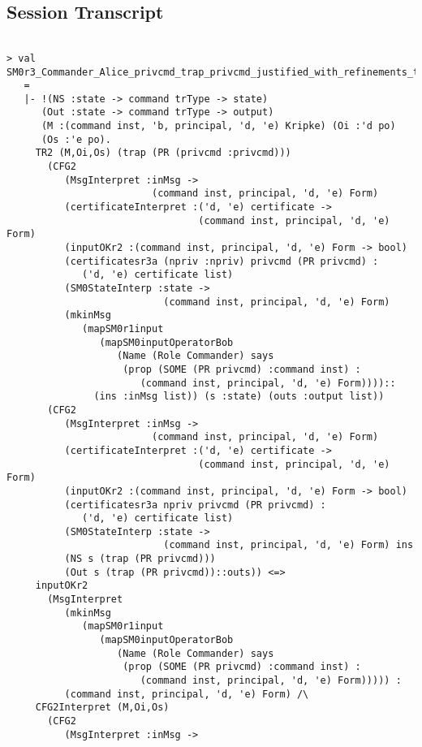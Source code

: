 \documentclass{report}
\begin{document}
\subsection{Session Transcript}
\label{trans6}
\begin{session}
  \begin{scriptsize}
\begin{verbatim}

> val SM0r3_Commander_Alice_privcmd_trap_privcmd_justified_with_refinements_thm
   =
   |- !(NS :state -> command trType -> state)
      (Out :state -> command trType -> output)
      (M :(command inst, 'b, principal, 'd, 'e) Kripke) (Oi :'d po)
      (Os :'e po).
     TR2 (M,Oi,Os) (trap (PR (privcmd :privcmd)))
       (CFG2
          (MsgInterpret :inMsg ->
                         (command inst, principal, 'd, 'e) Form)
          (certificateInterpret :('d, 'e) certificate ->
                                 (command inst, principal, 'd, 'e) Form)
          (inputOKr2 :(command inst, principal, 'd, 'e) Form -> bool)
          (certificatesr3a (npriv :npriv) privcmd (PR privcmd) :
             ('d, 'e) certificate list)
          (SM0StateInterp :state ->
                           (command inst, principal, 'd, 'e) Form)
          (mkinMsg
             (mapSM0r1input
                (mapSM0inputOperatorBob
                   (Name (Role Commander) says
                    (prop (SOME (PR privcmd) :command inst) :
                       (command inst, principal, 'd, 'e) Form))))::
               (ins :inMsg list)) (s :state) (outs :output list))
       (CFG2
          (MsgInterpret :inMsg ->
                         (command inst, principal, 'd, 'e) Form)
          (certificateInterpret :('d, 'e) certificate ->
                                 (command inst, principal, 'd, 'e) Form)
          (inputOKr2 :(command inst, principal, 'd, 'e) Form -> bool)
          (certificatesr3a npriv privcmd (PR privcmd) :
             ('d, 'e) certificate list)
          (SM0StateInterp :state ->
                           (command inst, principal, 'd, 'e) Form) ins
          (NS s (trap (PR privcmd)))
          (Out s (trap (PR privcmd))::outs)) <=>
     inputOKr2
       (MsgInterpret
          (mkinMsg
             (mapSM0r1input
                (mapSM0inputOperatorBob
                   (Name (Role Commander) says
                    (prop (SOME (PR privcmd) :command inst) :
                       (command inst, principal, 'd, 'e) Form))))) :
          (command inst, principal, 'd, 'e) Form) /\
     CFG2Interpret (M,Oi,Os)
       (CFG2
          (MsgInterpret :inMsg ->

\end{verbatim}
\end{scriptsize}
\end{session}
\end{document}
